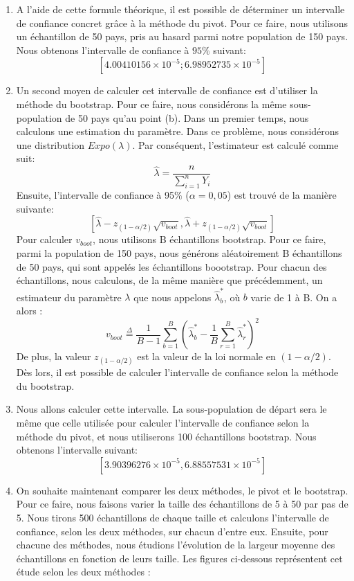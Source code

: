 \documentclass[a4paper, 11pt]{article}
\begin{document}
\begin{enumerate}[label=(\alph*)]
    \item A l'aide de cette formule théorique, il est possible de déterminer un intervalle de confiance concret grâce à la méthode du pivot. Pour ce faire, nous utilisons un échantillon de 50 pays, pris au hasard parmi notre population de 150 pays. Nous obtenons l'intervalle de confiance à $95\%$ suivant:
    $$\left[4.00410156\times 10^{-5}; 6.98952735\times 10^{-5}\right]$$
    \item Un second moyen de calculer cet intervalle de confiance est d'utiliser la méthode du bootstrap. Pour ce faire, nous considérons la même sous-population de 50 pays qu'au point (b). Dans un premier temps, nous calculons une estimation du paramètre. Dans ce problème, nous considérons une distribution $Expo(\lambda)$. Par conséquent, l'estimateur est calculé comme suit:
    $$\hat{\lambda}=\frac{n}{\sum^n_{i=1} Y_i}$$
    Ensuite, l'intervalle de confiance à 95$\%$ ($\alpha=0,05$) est trouvé de la manière suivante:
    $$\left[ \hat{\lambda}-z_{(1-\alpha/2)}\sqrt{v_{boot}}, \hat{\lambda}+z_{(1-\alpha/2)}\sqrt{v_{boot}}\right]$$
    Pour calculer $v_{boot}$, nous utilisons B échantillons bootstrap. Pour ce faire, parmi la population de 150 pays, nous générons aléatoirement B échantillons de 50 pays, qui sont appelés les échantillons boootstrap. Pour chacun des échantillons, nous calculons, de la même manière que précédemment, un estimateur du paramètre $\lambda$ que nous appelons $\hat{\lambda}^*_b$, où $b$ varie de 1 à B. On a alors :
    $$v_{boot}\overset{\Delta}{=}\frac{1}{B-1} \sum^B_{b=1}\left( \hat{\lambda}^*_b-\frac{1}{B}\sum^B_{r=1} \hat{\lambda}^*_r \right)^2$$
    De plus, la valeur $z_{(1-\alpha/2)}$ est la valeur de la loi normale en $(1-\alpha/2)$. Dès lors, il est possible de calculer l'intervalle de confiance selon la méthode du bootstrap.
    \item Nous allons calculer cette intervalle. La sous-population de départ sera le même que celle utilisée pour calculer l'intervalle de confiance selon la méthode du pivot, et nous utiliserons 100 échantillons bootstrap. Nous obtenons l'intervalle suivant:
    $$\left[3.90396276\times 10^{-5}, 6.88557531\times10^{-5}\right]$$
    \item On souhaite maintenant comparer les deux méthodes, le pivot et le bootstrap. Pour ce faire, nous faisons varier la taille des échantillons de 5 à 50 par pas de 5. Nous tirons 500 échantillons de chaque taille et calculons l'intervalle de confiance, selon les deux méthodes, sur chacun d'entre eux. Ensuite, pour chacune des méthodes, nous étudions l'évolution de la largeur moyenne des échantillons en fonction de leurs taille. Les figures ci-dessous représentent cet étude selon les deux méthodes :

\end{enumerate}
\end{document}
